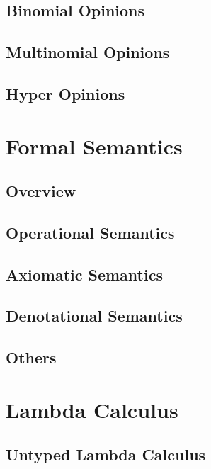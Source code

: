 \documentclass[a4paper]{report}
\begin{document}
\subsection{Binomial Opinions}

\subsection{Multinomial Opinions}

\subsection{Hyper Opinions}




\section{Formal Semantics}

\subsection{Overview}

\subsection{Operational Semantics}

\subsection{Axiomatic Semantics}

\subsection{Denotational Semantics}

\subsection{Others}




\section{Lambda Calculus}

\subsection{Untyped Lambda Calculus}
\end{document}
